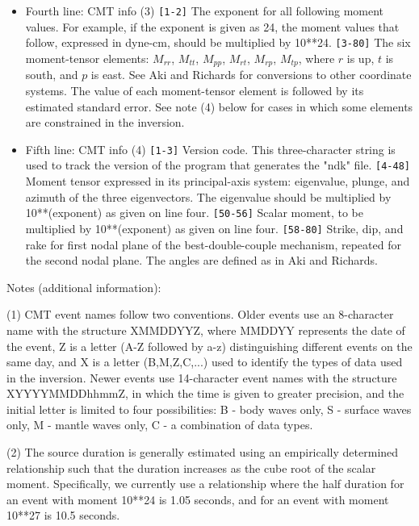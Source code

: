 \begin{itemize}
\item
Fourth line: CMT info (3)
\verb|[1-2]|   The exponent for all following moment values. For example, if the
        exponent is given as 24, the moment values that follow, expressed in 
        dyne-cm, should be multiplied by 10**24.
\verb|[3-80]|  The six moment-tensor elements: $M_{rr}$, $M_{tt}$, $M_{pp}$, $M_{rt}$, $M_{rp}$, $M_{tp}$, 
        where $r$ is up, $t$ is south, and $p$ is east. See Aki and Richards for conversions
        to other coordinate systems. The value of each moment-tensor
	  element is followed by its estimated standard error. See note (4)
	  below for cases in which some elements are constrained in the inversion.
        
\item
Fifth line: CMT info (4)
\verb|[1-3]|   Version code. This three-character string is used to track the version 
        of the program that generates the "ndk" file.
\verb|[4-48]|  Moment tensor expressed in its principal-axis system: eigenvalue, 
        plunge, and azimuth of the three eigenvectors. The eigenvalue should be
        multiplied by 10**(exponent) as given on line four.
\verb|[50-56]| Scalar moment, to be multiplied by 10**(exponent) as given on line four.
\verb|[58-80]| Strike, dip, and rake for first nodal plane of the best-double-couple 
        mechanism, repeated for the second nodal plane. The angles are defined
        as in Aki and Richards.

\end{itemize}
          
        
Notes (additional information):

(1) CMT event names follow two conventions. Older events use an 8-character 
name with the structure XMMDDYYZ, where MMDDYY represents the date of
the event, Z is a letter (A-Z followed by a-z) distinguishing different 
events on the same day, and X is a letter (B,M,Z,C,...) used to identify 
the types of data used in the inversion. Newer events use 14-character event 
names with the structure XYYYYMMDDhhmmZ, in which the time is given to greater
precision, and the initial letter is limited to four possibilities: B - body 
waves only, S - surface waves only, M - mantle waves only, C - a combination 
of data types.

(2) The source duration is generally estimated using an empirically determined
relationship such that the duration increases as the cube root of the scalar
moment. Specifically, we currently use a relationship where the half duration
for an event with moment 10**24 is 1.05 seconds, and for an event with moment
10**27 is 10.5 seconds.

